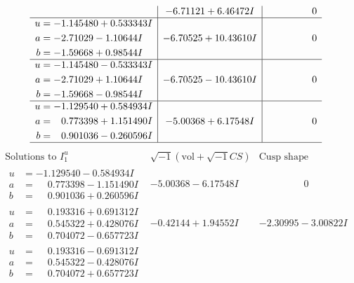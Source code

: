 \documentclass[1p]{elsarticle_modified}
\theoremstyle{definition}
\newcommand{\I}{\sqrt{-1}}
\begin{document}
$$\begin{array}{c|c|c}
 & -6.71121 + 6.46472 I & \phantom{-0.000000 } 0 \\ \hline\begin{aligned}
u &= -1.145480 + 0.533343 I \\
a &= -2.71029 - 1.10644 I \\
b &= -1.59668 + 0.98544 I\end{aligned}
 & -6.70525 + 10.43610 I & \phantom{-0.000000 } 0 \\ \hline\begin{aligned}
u &= -1.145480 - 0.533343 I \\
a &= -2.71029 + 1.10644 I \\
b &= -1.59668 - 0.98544 I\end{aligned}
 & -6.70525 - 10.43610 I & \phantom{-0.000000 } 0 \\ \hline\begin{aligned}
u &= -1.129540 + 0.584934 I \\
a &= \phantom{-}0.773398 + 1.151490 I \\
b &= \phantom{-}0.901036 - 0.260596 I\end{aligned}
 & -5.00368 + 6.17548 I & \phantom{-0.000000 } 0\\
 \hline 
 \end{array}$$\newpage$$\begin{array}{c|c|c}  
\text{Solutions to }I^u_{1}& \I (\text{vol} + \sqrt{-1}CS) & \text{Cusp shape}\\
 \hline 
\begin{aligned}
u &= -1.129540 - 0.584934 I \\
a &= \phantom{-}0.773398 - 1.151490 I \\
b &= \phantom{-}0.901036 + 0.260596 I\end{aligned}
 & -5.00368 - 6.17548 I & \phantom{-0.000000 } 0 \\ \hline\begin{aligned}
u &= \phantom{-}0.193316 + 0.691312 I \\
a &= \phantom{-}0.545322 + 0.428076 I \\
b &= \phantom{-}0.704072 - 0.657723 I\end{aligned}
 & -0.42144 + 1.94552 I & -2.30995 - 3.00822 I \\ \hline\begin{aligned}
u &= \phantom{-}0.193316 - 0.691312 I \\
a &= \phantom{-}0.545322 - 0.428076 I \\
b &= \phantom{-}0.704072 + 0.657723 I\end{aligned}

\end{array}$$
\end{document}
